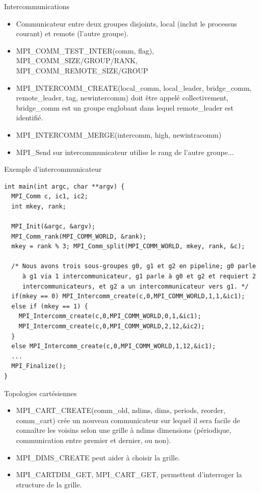 \documentclass[10pt]{beamer}
\begin{document}
\begin{frame}{Intercommunications}

  \begin{itemize}
    \item Communicateur entre deux groupes disjoints, local (inclut le processus courant) et remote (l'autre groupe).

    \item MPI\_COMM\_TEST\_INTER(comm, flag), MPI\_COMM\_SIZE/GROUP/RANK, MPI\_COMM\_REMOTE\_SIZE/GROUP

    \item MPI\_INTERCOMM\_CREATE(local\_comm, local\_leader, bridge\_comm, remote\_leader, tag, newintercomm) doit être appelé collectivement, bridge\_comm est un groupe englobant dans lequel remote\_leader est identifié.

    \item MPI\_INTERCOMM\_MERGE(intercomm, high, newintracomm)
    
    \item MPI\_Send sur intercommunicateur utilise le rang de l'autre groupe...
  \end{itemize}
\end{frame}

\begin{frame}[fragile]{Exemple d'intercommunicateur}

  \scriptsize
  \begin{verbatim}
int main(int argc, char **argv) { 
  MPI_Comm c, ic1, ic2;
  int mkey, rank; 

  MPI_Init(&argc, &argv); 
  MPI_Comm_rank(MPI_COMM_WORLD, &rank); 
  mkey = rank % 3; MPI_Comm_split(MPI_COMM_WORLD, mkey, rank, &c); 

  /* Nous avons trois sous-groupes g0, g1 et g2 en pipeline; g0 parle
     à g1 via 1 intercommunicateur, g1 parle à g0 et g2 et requiert 2
     intercommunicateurs, et g2 a un intercommunicateur vers g1. */
  if(mkey == 0) MPI_Intercomm_create(c,0,MPI_COMM_WORLD,1,1,&ic1);
  else if (mkey == 1) { 
    MPI_Intercomm_create(c,0,MPI_COMM_WORLD,0,1,&ic1); 
    MPI_Intercomm_create(c,0,MPI_COMM_WORLD,2,12,&ic2);
  } 
  else MPI_Intercomm_create(c,0,MPI_COMM_WORLD,1,12,&ic1);
  ...
  MPI_Finalize();
} 
  \end{verbatim}
\end{frame}

\begin{frame}{Topologies cartésiennes}

  \begin{itemize}
    \item MPI\_CART\_CREATE(comm\_old, ndims, dims, periods, reorder, comm\_cart) crée un nouveau communicateur sur lequel il sera facile de connaître les voisins selon une grille à ndims dimensions (périodique, communication entre premier et dernier, ou non). 

    \item MPI\_DIMS\_CREATE peut aider à choisir la grille.

    \item MPI\_CARTDIM\_GET, MPI\_CART\_GET, permettent d'interroger la structure de la grille.
  \end{itemize}
\end{frame}
\end{document}

